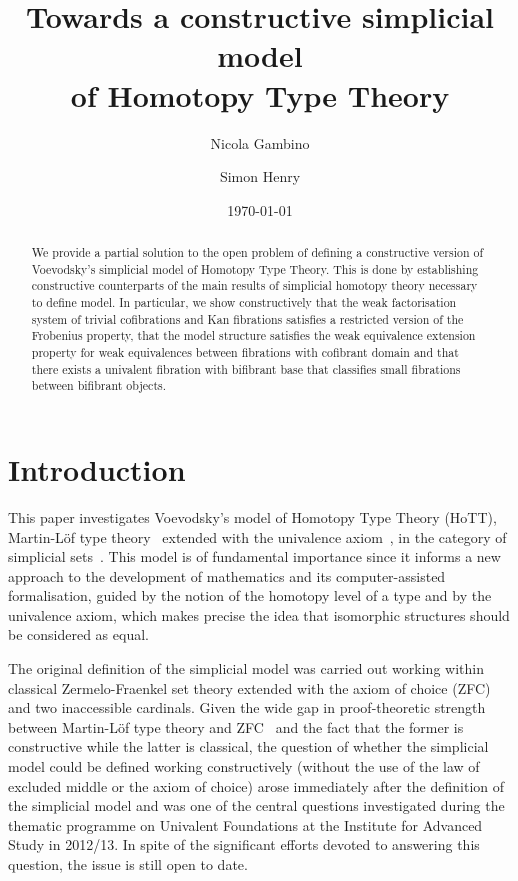 \documentclass[reqno,10pt,a4paper,oneside,draft]{amsart}
\title[]{Towards a constructive  simplicial model \\ of Homotopy Type Theory}
\begin{document}
\begin{abstract}
We provide a partial solution to the open problem of defining a constructive version of 
Voevodsky's simplicial model of Homotopy Type Theory. This is done by establishing
constructive counterparts of the main results of simplicial homotopy theory
necessary to define model. In particular, 
 we show constructively that the weak factorisation system of trivial cofibrations and Kan fibrations satisfies a
restricted version of the Frobenius property, that the model structure satisfies the weak equivalence extension property
for weak equivalences between fibrations with cofibrant domain and that there exists a univalent 
 fibration with bifibrant base that classifies small fibrations between bifibrant objects.
\end{abstract}

\author{Nicola Gambino}
\address{School of Mathematics, University of Leeds, Leeds LS2 9JT, United Kingdom}


\author{Simon Henry}
\address{Department of Mathematics and Statistics, Masaryk University, Brno, Czeck Republic}


 \date{\today}
 
 

\maketitle



\section*{Introduction} 

This paper investigates Voevodsky's model of Homotopy  Type Theory (HoTT), \ie Martin-L\"of type theory~\cite{nordstrom-petersson-smith:ml} extended with the univalence axiom~\cite{voevodsky:univalence}, in the category of simplicial sets~\cite{voevodsky-simplicial-model}. This model is of fundamental importance since it informs a new approach to the development of mathematics
and its computer-assisted formalisation, guided by the notion of the homotopy level of a type and by the univalence axiom, which makes precise the idea that isomorphic structures should be considered as equal. 

The original definition of the simplicial model  was carried out working within classical Zermelo-Fraenkel set theory extended with the axiom of choice (ZFC) and two inaccessible cardinals. Given the wide gap in proof-theoretic strength between Martin-L\"of type theory and ZFC~\cite{GrifforE:strsml} and the fact that the former is constructive  while the latter is classical,
 the question of whether the simplicial model could be defined working constructively (\ie without the use of the law of excluded middle or the axiom of choice) arose immediately after the definition of the simplicial
 model and was one of the
 central questions investigated during the thematic programme on Univalent Foundations at the Institute for Advanced Study in 2012/13. In spite of the significant efforts devoted to answering this question,
the issue is still open to date.
\end{document}
